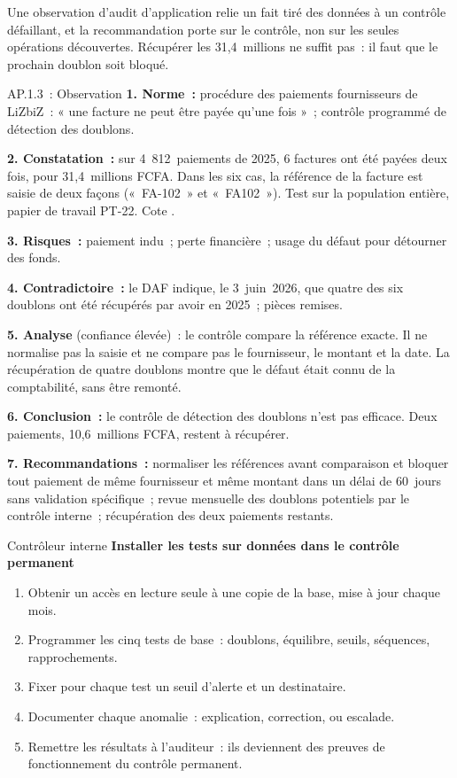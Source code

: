 Une observation d'audit d'application relie un fait tiré des données à un
contrôle défaillant, et la recommandation porte sur le contrôle, non sur
les seules opérations découvertes. Récupérer les 31,4~millions ne suffit
pas~: il faut que le prochain doublon soit bloqué.

\begin{boxobjet}{AP.1.3~: Observation}
\textbf{1. Norme~:} procédure des paiements fournisseurs de LiZbiZ~:
« une facture ne peut être payée qu'une fois »~; contrôle programmé de
détection des doublons.

\textbf{2. Constatation~:} sur 4~812~paiements de 2025, 6 factures ont été
payées deux fois, pour 31,4~millions FCFA. Dans les six cas, la référence
de la facture est saisie de deux façons («~FA-102~» et «~FA102~»).
Test sur la population entière, papier de travail PT-22. Cote \NON{}.

\textbf{3. Risques~:} paiement indu~; perte financière~; usage du défaut
pour détourner des fonds.

\textbf{4. Contradictoire~:} le DAF indique, le 3~juin~2026, que quatre des
six doublons ont été récupérés par avoir en 2025~; pièces remises.

\textbf{5. Analyse} (confiance élevée)~: le contrôle compare la référence
exacte. Il ne normalise pas la saisie et ne compare pas le fournisseur, le
montant et la date. La récupération de quatre doublons montre que le
défaut était connu de la comptabilité, sans être remonté.

\textbf{6. Conclusion~:} le contrôle de détection des doublons n'est pas
efficace. Deux paiements, 10,6~millions FCFA, restent à récupérer.

\textbf{7. Recommandations~:} normaliser les références avant comparaison
et bloquer tout paiement de même fournisseur et même montant dans un
délai de 60~jours sans validation spécifique~; revue mensuelle des
doublons potentiels par le contrôle interne~; récupération des deux
paiements restants.
\end{boxobjet}

\begin{boxmetier}{Contrôleur interne}
\textbf{Installer les tests sur données dans le contrôle permanent}
\begin{enumerate}
    \item Obtenir un accès en lecture seule à une copie de la base, mise à
          jour chaque mois.
    \item Programmer les cinq tests de base~: doublons, équilibre, seuils,
          séquences, rapprochements.
    \item Fixer pour chaque test un seuil d'alerte et un destinataire.
    \item Documenter chaque anomalie~: explication, correction, ou
          escalade.
    \item Remettre les résultats à l'auditeur~: ils deviennent des preuves
          de fonctionnement du contrôle permanent.
\end{enumerate}
\end{boxmetier}

